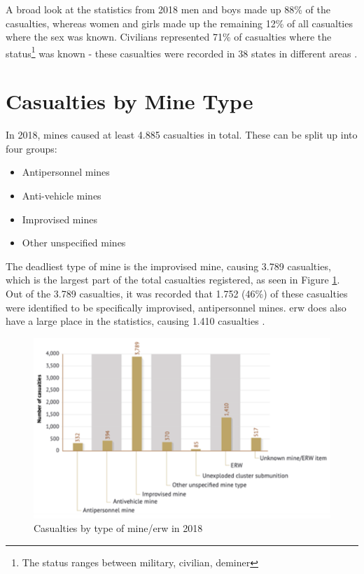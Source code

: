         \vspace{2mm}

A broad look at the statistics from 2018 men and boys made up 88\% of the casualties, whereas women and girls made up the remaining 12\% of all casualties where the sex was known. Civilians represented 71\% of casualties where the status\footnote{The status ranges between military, civilian, deminer} was known - these casualties were recorded in 38 states in different areas \cite{LandmineMonitor2019}.

\section{Casualties by Mine Type}

In 2018, mines caused at least 4.885 casualties in total. These can be split up into four groups: 
\begin{itemize}
    \item Antipersonnel mines
            \vspace{-4mm}
    \item Anti-vehicle mines
            \vspace{-4mm}
    \item Improvised mines
            \vspace{-4mm}
    \item Other unspecified mines
\end{itemize}

The deadliest type of mine is the improvised mine, causing 3.789 casualties, which is the largest part of the total casualties registered, as seen in Figure \ref{fig:casualties_by_type}. Out of the 3.789 casualties, it was recorded that 1.752 (46\%) of these casualties were identified to be specifically improvised, antipersonnel mines. \gls{erw} does also have a large place in the statistics, causing 1.410 casualties \cite{LandmineMonitor2019}.

\begin{figure}[!ht]
  \centering
  \includegraphics[width=12.5cm]{00 - Images/casualties_by_type.png}
  \caption{Casualties by type of mine/\gls{erw} in 2018 \cite{LandmineMonitor2019}}
  \label{fig:casualties_by_type}
\end{figure}